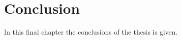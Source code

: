 \chapter{Conclusion} \label{cha:conclusion}
In this final chapter the conclusions of the thesis is given.
